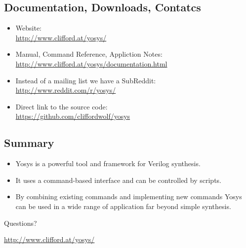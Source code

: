 
\subsection{Documentation, Downloads, Contatcs}

\begin{frame}{\subsecname}
\begin{itemize}
\item Website: \\
\smallskip\hskip1cm\url{http://www.clifford.at/yosys/}

\bigskip
\item Manual, Command Reference, Appliction Notes: \\
\smallskip\hskip1cm\url{http://www.clifford.at/yosys/documentation.html}

\bigskip
\item Instead of a mailing list we have a SubReddit: \\
\smallskip\hskip1cm\url{http://www.reddit.com/r/yosys/}

\bigskip
\item Direct link to the source code: \\
\smallskip\hskip1cm\url{https://github.com/cliffordwolf/yosys}
\end{itemize}
\end{frame}


\subsection{Summary}

\begin{frame}{\subsecname}
\begin{itemize}
\item Yosys is a powerful tool and framework for Verilog synthesis.
\item It uses a command-based interface and can be controlled by scripts.
\item By combining existing commands and implementing new commands Yosys can
be used in a wide range of application far beyond simple synthesis.
\end{itemize}

\bigskip
\bigskip
\begin{center}
Questions?
\end{center}

\bigskip
\bigskip
\begin{center}
\url{http://www.clifford.at/yosys/}
\end{center}
\end{frame}

